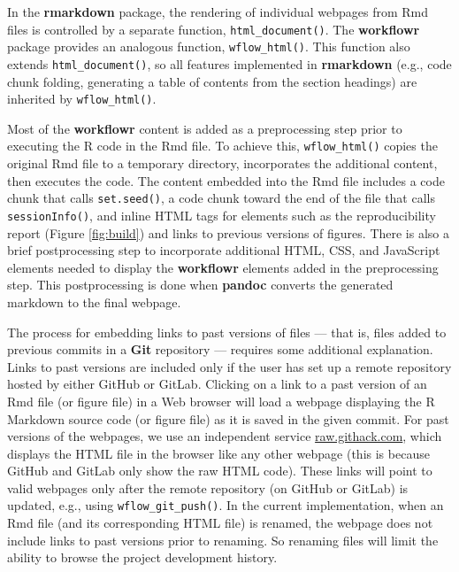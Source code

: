 \documentclass[9pt,a4paper]{extarticle}
\begin{document}
In the \textbf{rmarkdown} package, the rendering of individual webpages from Rmd
files is controlled by a separate function, \texttt{html\_document()}. The
 \textbf{workflowr} package provides an analogous function, \texttt{wflow\_html()}. This
function also extends \texttt{html\_document()}, so all features implemented in
 \textbf{rmarkdown} (e.g., code chunk folding, generating a table of contents from
the section headings) are inherited by \texttt{wflow\_html()}.

Most of the \textbf{workflowr} content is added as a preprocessing step prior to
executing the R code in the Rmd file. To achieve this, \texttt{wflow\_html()}
copies the original Rmd file to a temporary directory, incorporates the
additional content, then executes the code. The content embedded into
the Rmd file includes a code chunk that calls \texttt{set.seed()}, a code chunk
toward the end of the file that calls \texttt{sessionInfo()}, and inline HTML
tags for elements such as the reproducibility report (Figure \ref{fig:build}) and
links to previous versions of figures. There is also a brief
postprocessing step to incorporate additional HTML, CSS, and JavaScript
elements needed to display the \textbf{workflowr} elements added in the
preprocessing step. This postprocessing is done when \textbf{pandoc} converts the
generated markdown to the final webpage.

The process for embedding links to past versions of files --- that is,
files added to previous commits in a \textbf{Git} repository --- requires some
additional explanation. Links to past versions are included only if the
user has set up a remote repository hosted by either GitHub or GitLab.
Clicking on a link to a past version of an Rmd file (or figure file) in
a Web browser will load a webpage displaying the R Markdown source code
(or figure file) as it is saved in the given commit. For past versions
of the webpages, we use an independent service
\href{https://raw.githack.com/}{raw.githack.com}, which displays the
HTML file in the browser like any other webpage (this is because GitHub
and GitLab only show the raw HTML code). These links will point to valid
webpages only after the remote repository (on GitHub or GitLab) is
updated, e.g., using \texttt{wflow\_git\_push()}. In the current implementation,
when an Rmd file (and its corresponding HTML file) is renamed, the
webpage does not include links to past versions prior to renaming. So
renaming files will limit the ability to browse the project development
history.
\end{document}
